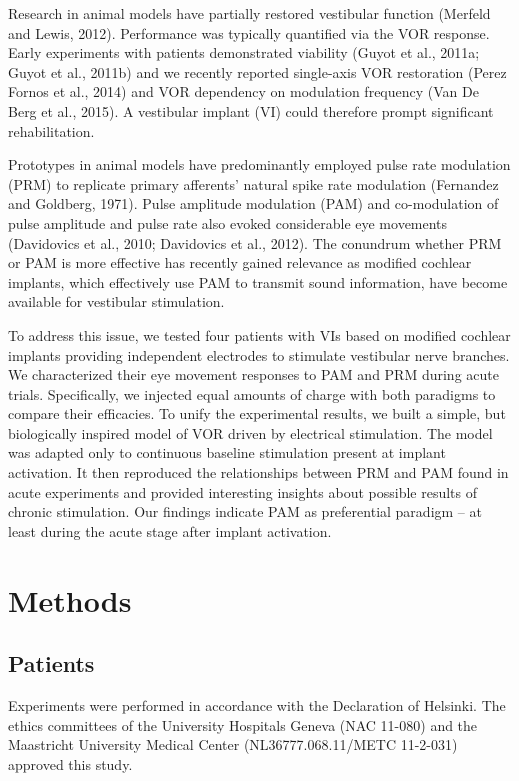 Research in animal models have partially restored vestibular function (Merfeld and Lewis, 2012). Performance was typically quantified via the VOR response. Early experiments with patients demonstrated viability (Guyot et al., 2011a; Guyot et al., 2011b) and we recently reported single-axis VOR restoration (Perez Fornos et al., 2014) and VOR dependency on modulation frequency (Van De Berg et al., 2015). A vestibular implant (VI) could therefore prompt significant rehabilitation.

Prototypes in animal models have predominantly employed pulse rate modulation (PRM) to replicate primary afferents’ natural spike rate modulation (Fernandez and Goldberg, 1971). Pulse amplitude modulation (PAM) and co-modulation of pulse amplitude and pulse rate also evoked considerable eye movements (Davidovics et al., 2010; Davidovics et al., 2012). The conundrum whether PRM or PAM is more effective has recently gained relevance as modified cochlear implants, which effectively use PAM to transmit sound information, have become available for vestibular stimulation.

To address this issue, we tested four patients with VIs based on modified cochlear implants providing independent electrodes to stimulate vestibular nerve branches. We characterized their eye movement responses to PAM and PRM during acute trials. Specifically, we injected equal amounts of charge with both paradigms to compare their efficacies. To unify the experimental results, we built a simple, but biologically inspired model of VOR driven by electrical stimulation. The model was adapted only to continuous baseline stimulation present at implant activation. It then reproduced the relationships between PRM and PAM found in acute experiments and provided interesting insights about possible results of chronic stimulation. Our findings indicate PAM as preferential paradigm – at least during the acute stage after implant activation. 

\section{Methods}
\subsection{Patients}
Experiments were performed in accordance with the Declaration of Helsinki. The ethics committees of the University Hospitals Geneva (NAC 11-080) and the Maastricht University Medical Center (NL36777.068.11/METC 11-2-031) approved this study. 

